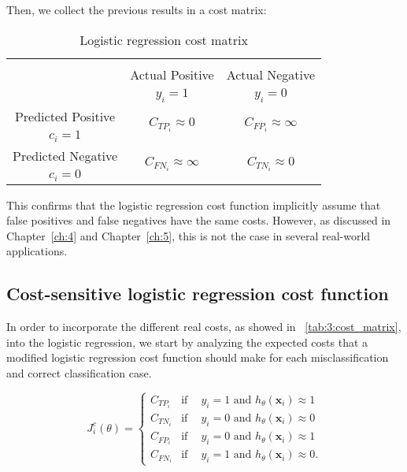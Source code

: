 \noindent Then, we collect the previous results in a cost matrix:
  \begin{table}[htbp]
    \centering
    \footnotesize
    \begin{tabular}{c|c|c}
      \multicolumn{3}{c}{}\\
      \multicolumn{1}{c|}{}  & Actual Positive& Actual Negative \\
      \multicolumn{1}{c|}{} & $y_i=1$& $y_i=0$ \\
      \hline
      Predicted Positive    & \multirow{ 2}{*}{$C_{{TP}_i}\approx 0$} & 
      \multirow{2}{*}{$C_{{FP}_i}\approx \infty$} \\
      $c_i=1$ & &\\
      \hline
      Predicted Negative    & \multirow{ 2}{*}{$C_{{FN}_i}\approx \infty$} & \multirow{ 
      2}{*}{$C_{{TN}_i}\approx 0$} \\
      $c_i=0$ & &\\
    \end{tabular}
    \caption{Logistic regression cost matrix}
    \label{tab:7:1}
  \end{table} 
  
This confirms that the logistic regression cost function implicitly assume that 
false positives and false negatives have the same costs. However, as discussed in 
Chapter~\ref{ch:4} and Chapter~\ref{ch:5}, this is not the case in several real-world 
applications.

  
\subsection{Cost-sensitive logistic regression cost function}
\label{sec:7:cscostfunction}

In order to incorporate the different real costs, as showed in 
\tablename{~\ref{tab:3:cost_matrix}}, into the logistic regression, we start by analyzing the 
expected costs that a modified logistic regression cost function should make for each 
misclassification and correct classification case.

\begin{equation*}
  J^c_i(\theta) = 
  \begin{cases}
    C_{TP_i}    & \text{if} \phantom{-}  y_i = 1 \text{ and } h_\theta(\mathbf{x}_i) \approx 1  \\
    C_{TN_i}    & \text{if} \phantom{-}  y_i = 0 \text{ and } h_\theta(\mathbf{x}_i) \approx 0  \\
    C_{FP_i}    & \text{if} \phantom{-}  y_i = 0 \text{ and } h_\theta(\mathbf{x}_i) \approx 1  \\
    C_{FN_i}    & \text{if} \phantom{-}  y_i = 1 \text{ and } h_\theta(\mathbf{x}_i) \approx 0 .
  \end{cases}
\end{equation*}

